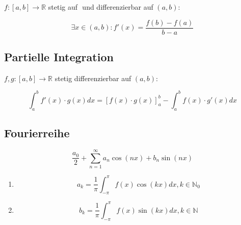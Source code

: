 \documentclass[twoside]{article}
\begin{document}
			\begin{math} f: [a,b] \to \mathbb{R} \end{math} stetig auf \begin{math} [a,b] \end{math} und differenzierbar auf \begin{math} (a,b) \end{math}:
			
			\begin{displaymath}
				\exists x \in (a,b):f'(x) = \frac{f(b) - f(a)}{b - a}
			\end{displaymath}
	
		\subsection{Partielle Integration}
			\begin{math} f, g: [a, b] \to \mathbb{R} \end{math} stetig differenzierbar auf \begin{math} (a,b) \end{math}:
			
			\begin{displaymath}
				\int_{a}^{b} f'(x) \cdot g(x) dx = [f(x) \cdot g(x)]_{a}^{b} - \int_{a}^{b} f(x) \cdot g'(x) dx
			\end{displaymath}
		
		\subsection{Fourierreihe}
		
			\begin{displaymath}
				\frac{a_0}{2} + \sum_{n=1}^{\infty} a_n \cos(nx) + b_n \sin(nx)
			\end{displaymath}
			
			\begin{enumerate}[]
				
				\item 
					\begin{displaymath}
						a_k = \frac{1}{\pi} \int_{-\pi}^{\pi} f(x) \cos(kx) dx, k \in \mathbb{N}_0
					\end{displaymath}
			
				\item
					\begin{displaymath}
						b_k = \frac{1}{\pi} \int_{-\pi}^{\pi} f(x) \sin(kx) dx, k \in \mathbb{N}
					\end{displaymath}
			
			\end{enumerate}
			
\end{document}
